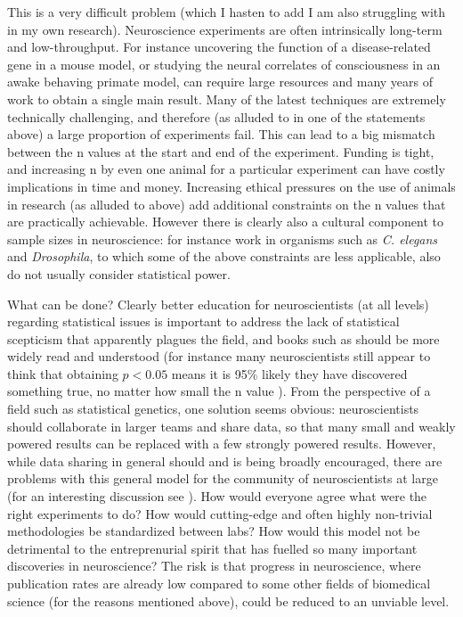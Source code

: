 \documentclass[a4paper,11pt]{article}
\begin{document}
This is a very difficult problem (which I hasten to add I am also
struggling with in my own research).  Neuroscience experiments are
often intrinsically long-term and low-throughput. For instance
uncovering the function of a disease-related gene in a mouse model, or
studying the neural correlates of consciousness in an awake behaving primate
model, can require large resources and many years of work to obtain a
single main result. Many of the latest techniques are extremely
technically challenging, and therefore (as alluded to in one of the
statements above) a large proportion of experiments fail. This can
lead to a big mismatch between the n values at the start and end of
the experiment. Funding is tight, and increasing n by even one animal
for a particular experiment can have costly implications in time and
money.  Increasing ethical pressures on the use of animals in research
(as alluded to above) add additional constraints on the n values that
are practically achievable. However there is clearly also a cultural
component to sample sizes in neuroscience: for instance work in
organisms such as {\em C. elegans} and {\em Drosophila}, to which some of the
above constraints are less applicable, also do not usually consider statistical power.

What can be done?  Clearly better education for neuroscientists (at
all levels) regarding statistical issues is important to address the
lack of statistical scepticism that apparently plagues the field, and
books such as \cite{reinhardt15} should be more widely read and
understood (for instance many neuroscientists still appear to think
that obtaining $p < 0.05$ means it is 95\% likely they have discovered
something true, no matter how small the n value \cite{halsey15}).
From the perspective of a field such as statistical genetics, one
solution seems obvious: neuroscientists should collaborate in larger
teams and share data, so that many small and weakly powered results
can be replaced with a few strongly powered results. However, while
data sharing in general should and is being broadly encouraged, there
are problems with this general model for the community of
neuroscientists at large (for an interesting discussion see
\cite{mainen16}). How would everyone agree what were the right
experiments to do?  How would cutting-edge and often highly
non-trivial methodologies be standardized between labs?  How would
this model not be detrimental to the entreprenurial spirit that has
fuelled so many important discoveries in neuroscience?  The risk is
that progress in neuroscience, where publication rates are already low
compared to some other fields of biomedical science (for the reasons
mentioned above), could be reduced to an unviable level.
\end{document}
